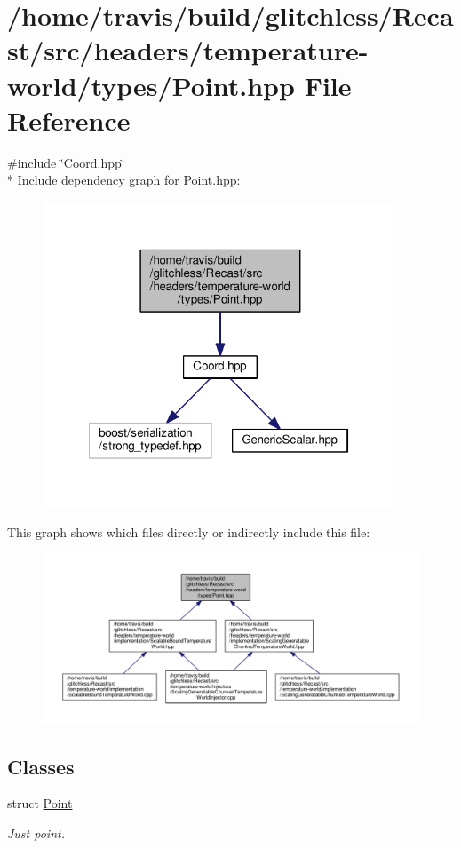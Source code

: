 \hypertarget{temperature-world_2types_2_point_8hpp}{\section{/home/travis/build/glitchless/\-Recast/src/headers/temperature-\/world/types/\-Point.hpp File Reference}
\label{temperature-world_2types_2_point_8hpp}
}
{\ttfamily \#include \char`\"{}Coord.\-hpp\char`\"{}}\\*
Include dependency graph for Point.\-hpp\-:
\nopagebreak
\begin{figure}[H]
\begin{center}
\leavevmode
\includegraphics[width=297pt]{temperature-world_2types_2_point_8hpp__incl}
\end{center}
\end{figure}
This graph shows which files directly or indirectly include this file\-:
\nopagebreak
\begin{figure}[H]
\begin{center}
\leavevmode
\includegraphics[width=350pt]{temperature-world_2types_2_point_8hpp__dep__incl}
\end{center}
\end{figure}
\subsection*{Classes}
\begin{DoxyCompactItemize}
\item 
struct \hyperlink{struct_point}{Point}
\begin{DoxyCompactList}\small\item\em Just point. \end{DoxyCompactList}\end{DoxyCompactItemize}
